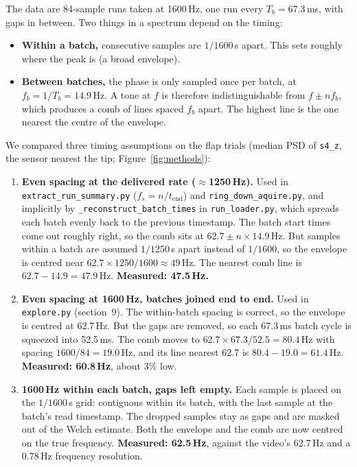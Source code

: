\documentclass[11pt]{article}
\newcommand{\code}[1]{\texttt{#1}}
\begin{document}
The data are 84-sample runs taken at 1600\,Hz, one run every
$T_b = 67.3$\,ms, with gaps in between. Two things in a spectrum depend on
the timing:

\begin{itemize}
  \item \textbf{Within a batch,} consecutive samples are $1/1600$\,s apart.
        This sets roughly where the peak is (a broad envelope).
  \item \textbf{Between batches,} the phase is only sampled once per batch, at
        $f_b = 1/T_b = 14.9$\,Hz. A tone at $f$ is therefore indistinguishable
        from $f \pm n f_b$, which produces a comb of lines spaced $f_b$ apart.
        The highest line is the one nearest the centre of the envelope.
\end{itemize}

We compared three timing assumptions on the flap trials (median PSD of
\code{s4\_z}, the sensor nearest the tip; Figure~\ref{fig:methods}):

\begin{enumerate}
  \item \textbf{Even spacing at the delivered rate ($\approx$1250\,Hz).}
        Used in \code{extract\_run\_summary.py} ($f_s = n / t_\text{end}$)
        and \code{ring\_down\_aquire.py}, and implicitly by
        \code{\_reconstruct\_batch\_times} in \code{run\_loader.py}, which
        spreads each
        batch evenly back to the previous timestamp. The batch start times
        come out roughly right, so the comb sits at
        $62.7 \pm n \times 14.9$\,Hz. But samples within a batch are assumed
        $1/1250$\,s apart instead of $1/1600$, so the envelope is centred
        near $62.7 \times 1250/1600 \approx 49$\,Hz. The nearest comb line
        is $62.7 - 14.9 = 47.9$\,Hz. \textbf{Measured: 47.5\,Hz.}
  \item \textbf{Even spacing at 1600\,Hz, batches joined end to end.} Used
        in \code{explore.py} (section~9). The within-batch spacing is
        correct, so the envelope is centred at 62.7\,Hz. But the gaps are
        removed, so each 67.3\,ms batch cycle is squeezed into 52.5\,ms. The
        comb moves to $62.7 \times 67.3/52.5 = 80.4$\,Hz with spacing
        $1600/84 = 19.0$\,Hz, and its line nearest 62.7 is
        $80.4 - 19.0 = 61.4$\,Hz. \textbf{Measured: 60.8\,Hz}, about 3\% low.
  \item \textbf{1600\,Hz within each batch, gaps left empty.} Each sample is
        placed on the $1/1600$\,s grid: contiguous within its batch, with the
        last sample at the batch's read timestamp. The dropped samples stay
        as gaps and are masked out of the Welch estimate. Both the envelope
        and the comb are now centred on the true frequency.
        \textbf{Measured: 62.5\,Hz}, against the video's 62.7\,Hz and a
        0.78\,Hz frequency resolution.
\end{enumerate}
\end{document}
